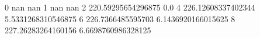 0 nan nan
1 nan nan
2 220.59295654296875 0.0
4 226.12608337402344 5.5331268310546875
6 226.7366485595703 6.1436920166015625
8 227.26283264160156 6.6698760986328125
